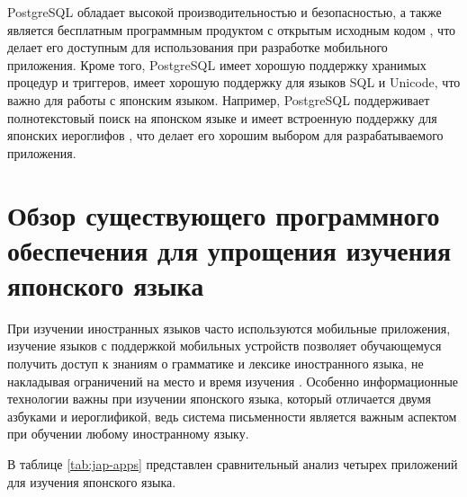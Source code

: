 PostgreSQL обладает высокой производительностью и безопасностью,
а также является бесплатным программным продуктом с открытым
исходным кодом \cite{relational-dbms}, что делает его доступным для использования при
разработке мобильного приложения. Кроме того, PostgreSQL имеет
хорошую поддержку хранимых процедур и триггеров, имеет хорошую
поддержку для языков SQL и Unicode, что важно для 
работы с японским языком. Например, PostgreSQL поддерживает 
полнотекстовый поиск на японском языке и имеет встроенную 
поддержку для японских иероглифов \cite{postgresql}, что делает его
хорошим выбором для разрабатываемого приложения.

\section{Обзор существующего программного обеспечения для упрощения изучения японского языка}

При изучении иностранных языков часто используются
мобильные приложения, изучение языков с поддержкой мобильных устройств
позволяет обучающемуся получить доступ к знаниям о грамматике и
лексике иностранного языка, не накладывая ограничений на место
и время изучения \cite{mobapps-ll}. Особенно информационные технологии
важны при изучении японского языка, который отличается двумя
азбуками и иероглификой, ведь система письменности является важным
аспектом при обучении любому иностранному языку.

В таблице \ref{tab:jap-apps} представлен сравнительный анализ
четырех приложений для изучения японского языка.

